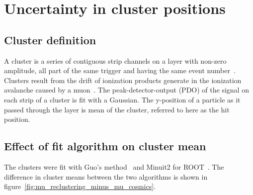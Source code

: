 

\chapter[Cluster position uncertainty]{Uncertainty in cluster positions}
\label{appendix:clustering}


\section{Cluster definition}
\label{sec:appendix_clustering_cluster_def}

A cluster is a series of contiguous strip channels on a layer with non-zero amplitude, all part of the same trigger and having the same event number~\cite{lefebvre_thesis}. Clusters result from the drift of ionization products generate in the ionization avalanche caused by a muon~\cite{townsend_electricity_1915}. The peak-detector-output (PDO) of the signal on each strip of a cluster is fit with a Gaussian. The y-position of a particle as it passed through the layer is mean of the cluster, referred to here as the hit position.

\section{Effect of fit algorithm on cluster mean}
\label{sec:appendix_clustering_cluster_fit}

The clusters were fit with Guo's method~\cite{guo_simple_2011} and Minuit2 for ROOT~\cite{hatlo_developments_2005}. The difference in cluster means between the two algorithms is shown in figure~\ref{fig:mu_reclustering_minus_mu_cosmics}.

